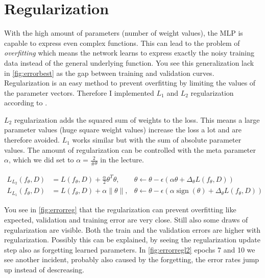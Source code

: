 \documentclass[a4paper,11pt]{article}
\begin{document}
\section{Regularization}\label{sec:regularization}

With the high amount of parameters (number of weight values), the MLP
is capable to express even complex functions.
This can lead to the problem of \emph{overfitting} which means the network
learns to express exactly the noisy training data instead of the general
underlying function. You see this generalization lack in \autoref{fig:errorbest}
as the gap between training and validation curves.
Regularization is an easy method to prevent overfitting by limiting the values
of the parameter vectors. Therefore I implemented
$L_1$ and $L_2$ regularization according to \cite{goodfellow71}.

$L_2$ regularization adds the squared sum of weights to the loss.
This means a large parameter values (huge square weight values) increase the loss a
lot and are therefore avoided. $L_1$ works similar but with the sum of absolute
parameter values. The amount of regularization can be controlled with the meta
parameter $\alpha$, which we did set to $\alpha=\frac{2}{\#\theta}$ in the lecture.

\begin{align}
  L_{L_2}(f_\theta, D) &= L(f_\theta, D) + \frac{\alpha}{2} \theta^T \theta,
  &\theta \leftarrow \theta - \epsilon (\alpha \theta + \Delta_\theta L(f_\theta,
  D)) \\
  L_{L_1}(f_\theta, D) &= L(f_\theta, D) + \alpha \lVert \theta \rVert,
  &\theta \leftarrow \theta - \epsilon (\alpha \mathop{sign}(\theta) + \Delta_\theta L(f_\theta,D))
\end{align}

You see in \autoref{fig:errorreg} that the regularization can prevent
overfitting like expected, validation and training error are very close.
Still also some draws of regularization are visible.
Both the train and the validation errors are higher with regularization.
Possibly this can be explained, by seeing the regularization update step also
as forgetting learned parameters.
In \autoref{fig:errorregl2} epochs 7 and 10 we see another incident,
probably also caused by the forgetting, the error rates jump up instead of descreasing.
\end{document}
